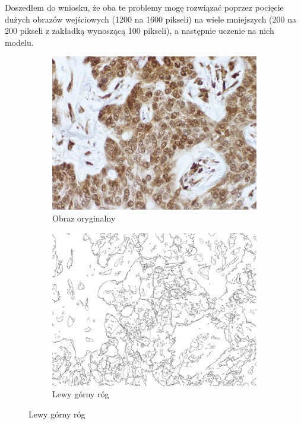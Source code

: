 \documentclass{article}
\begin{document}
Doszedłem do wniosku, że oba te problemy mogę rozwiązać poprzez pocięcie dużych obrazów wejściowych (1200 na 1600 pikseli) na wiele mniejszych (200 na 200 pikseli z zakładką wynoszącą 100 pikseli), a następnie uczenie na nich modelu.
\begin{figure}[H]
    \centering
    \begin{subfigure}{0.8\linewidth}
        \includegraphics[width=\linewidth]{images/input.png}
        \caption{Obraz oryginalny}
    \end{subfigure}
    \begin{subfigure}{0.4\linewidth}
        \includegraphics[width=\linewidth]{images/output.jpg}
        \caption{Lewy górny róg}
    \end{subfigure}

\end{figure}
\end{document}
